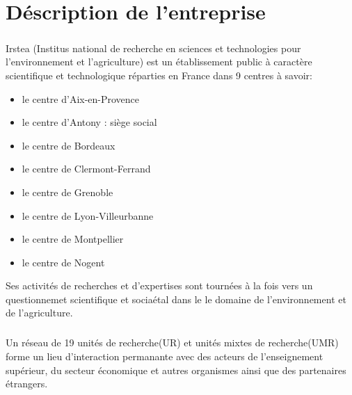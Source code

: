 \chapter{Déscription de l'entreprise}

\paragraph{}
Irstea (Institus national de recherche en sciences et technologies pour l'environnement et l'agriculture) est un établissement public à caractère scientifique  et technologique réparties en France dans 9 centres à savoir:  
\begin{itemize}
 \item le centre d'Aix-en-Provence
 \item le centre d'Antony : siège social
 \item le centre de Bordeaux
 \item le centre de Clermont-Ferrand
 \item le centre de Grenoble
 \item le centre de Lyon-Villeurbanne
 \item le centre de Montpellier
 \item le centre de Nogent
\end{itemize}

Ses activités de recherches et d'expertises sont tournées à la fois vers un questionnemet scientifique et sociaétal dans le le domaine de l'environnement et de l'agriculture. 

\paragraph{}
Un réseau de 19 unités de recherche(UR) et unités mixtes de recherche(UMR) forme un lieu d'interaction permanante avec des acteurs de l'enseignement supérieur, du secteur économique et autres organismes ainsi que des partenaires étrangers.
